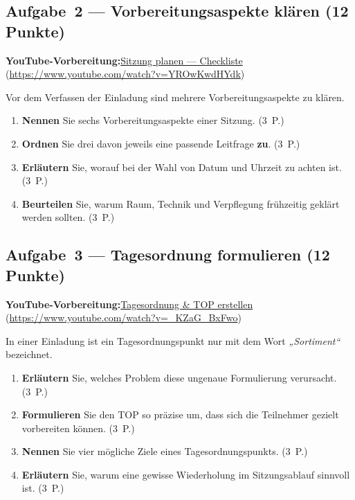 \documentclass[11pt, a4paper]{article}
\begin{document}
\subsection*{Aufgabe~2 --- Vorbereitungsaspekte klären (12 Punkte)}

\noindent\textbf{\color{bfwAccent}YouTube-Vorbereitung:}\enspace \href{https://www.youtube.com/watch?v=YROwKwdHYdk}{Sitzung planen --- Checkliste} (\url{https://www.youtube.com/watch?v=YROwKwdHYdk})

\medskip
Vor dem Verfassen der Einladung sind mehrere Vorbereitungsaspekte zu klären.

\begin{enumerate}[label=(\alph*)]
  \item \textbf{Nennen} Sie sechs Vorbereitungsaspekte einer Sitzung. \hfill (3~P.)
  \item \textbf{Ordnen} Sie drei davon jeweils eine passende Leitfrage \textbf{zu}. \hfill (3~P.)
  \item \textbf{Erläutern} Sie, worauf bei der Wahl von Datum und Uhrzeit zu achten ist. \hfill (3~P.)
  \item \textbf{Beurteilen} Sie, warum Raum, Technik und Verpflegung frühzeitig geklärt werden sollten. \hfill (3~P.)
\end{enumerate}

\subsection*{Aufgabe~3 --- Tagesordnung formulieren (12 Punkte)}

\noindent\textbf{\color{bfwAccent}YouTube-Vorbereitung:}\enspace \href{https://www.youtube.com/watch?v=_KZaG_BxFwo}{Tagesordnung \& TOP erstellen} (\url{https://www.youtube.com/watch?v=_KZaG_BxFwo})

\medskip
In einer Einladung ist ein Tagesordnungspunkt nur mit dem Wort \emph{„Sortiment“} bezeichnet.

\begin{enumerate}[label=(\alph*)]
  \item \textbf{Erläutern} Sie, welches Problem diese ungenaue Formulierung verursacht. \hfill (3~P.)
  \item \textbf{Formulieren} Sie den TOP so präzise um, dass sich die Teilnehmer gezielt vorbereiten können. \hfill (3~P.)
  \item \textbf{Nennen} Sie vier mögliche Ziele eines Tagesordnungspunkts. \hfill (3~P.)
  \item \textbf{Erläutern} Sie, warum eine gewisse Wiederholung im Sitzungsablauf sinnvoll ist. \hfill (3~P.)
\end{enumerate}
\end{document}
